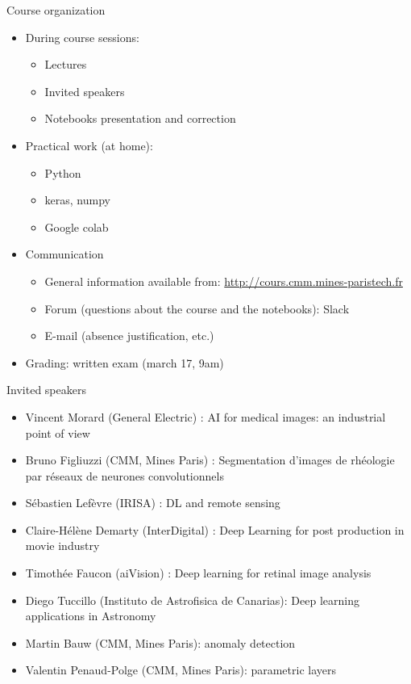 \documentclass[xcolor=pdftex,dvipsnames,table,mathserif]{beamer}
\begin{document}
\begin{frame}{Course organization}

  \begin{itemize}
  \item During course sessions:
    \begin{itemize}
    \item Lectures
    \item Invited speakers
    \item Notebooks presentation and correction
    \end{itemize}
  \item Practical work (at home):
    \begin{itemize}
    \item Python
    \item keras, numpy
    \item Google colab
    \end{itemize}
  \item Communication
  \begin{itemize}
  \item General information available from: \url{http://cours.cmm.mines-paristech.fr}
  \item Forum (questions about the course and the notebooks): Slack
  \item E-mail (absence justification, etc.)
  \end{itemize}
\item Grading: written exam (march 17, 9am)
   \end{itemize}
\end{frame}


\begin{frame}{Invited speakers}

  \begin{itemize}
  \item Vincent Morard (General Electric) : AI for medical images: an industrial point of view
    \item Bruno Figliuzzi (CMM, Mines Paris) : Segmentation d'images de rhéologie par réseaux de neurones convolutionnels
    \item Sébastien Lefèvre (IRISA) : DL and remote sensing
    \item Claire-Hélène Demarty (InterDigital) : Deep Learning for post production in movie industry
    \item Timothée Faucon (aiVision) : Deep learning for retinal image analysis
    \item Diego Tuccillo (Instituto de Astrofisica de Canarias): Deep learning applications in Astronomy
    \item Martin Bauw (CMM, Mines Paris): anomaly detection
    \item Valentin Penaud-Polge (CMM, Mines Paris): parametric layers
   \end{itemize}




\end{frame}
\end{document}
